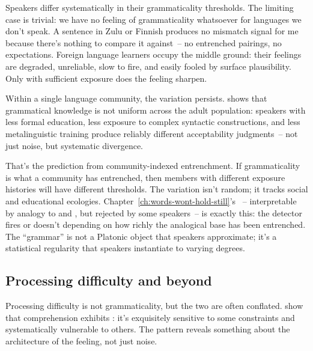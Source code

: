 Speakers differ systematically in their grammaticality thresholds. The limiting case is trivial: we have no feeling of grammaticality whatsoever for languages we don't speak. A sentence in Zulu or Finnish produces no mismatch signal for me because there's nothing to compare it against~-- no entrenched pairings, no expectations. Foreign language learners occupy the middle ground: their feelings are degraded, unreliable, slow to fire, and easily fooled by surface plausibility. Only with sufficient exposure does the feeling sharpen.

Within a single language community, the variation persists. \textcite{dabrowska2012} shows that grammatical knowledge is not uniform across the adult population: speakers with less formal education, less exposure to complex syntactic constructions, and less metalinguistic training produce reliably different acceptability judgments~-- not just noise, but systematic divergence.

That's the prediction from community-indexed entrenchment. If grammaticality is what a community has entrenched, then members with different exposure histories will have different thresholds. The variation isn't random; it tracks social and educational ecologies. Chapter~\ref{ch:words-wont-hold-still}'s ~-- interpretable by analogy to  and , but rejected by some speakers~-- is exactly this: the detector fires or doesn't depending on how richly the analogical base has been entrenched. The \enquote{grammar} is not a Platonic object that speakers approximate; it's a statistical regularity that speakers instantiate to varying degrees.

\subsection{Processing difficulty and beyond}
\label{sec:14:processing-difficulty}

Processing difficulty is not grammaticality, but the two are often conflated. \textcite{phillips2011grammatical} show that comprehension exhibits : it's exquisitely sensitive to some constraints and systematically vulnerable to others. The pattern reveals something about the architecture of the feeling, not just noise.

